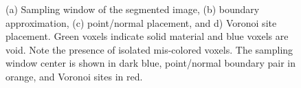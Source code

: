\begin{figure}[ht]
{\label{fig:vor2}}
%
\caption{(a) Sampling window of the segmented image, (b) boundary approximation, (c) point/normal placement, and d) Voronoi site placement. Green voxels indicate solid material and blue voxels are void.  Note the presence of isolated mis-colored voxels.  The sampling window center is shown in dark blue, point/normal boundary pair in orange, and Voronoi sites in red.}
\label{fig:vor}
\end{figure}

